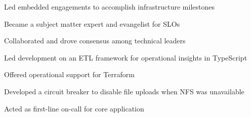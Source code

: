 \begin{job}
  
  \begin{accomplishments}
    \item Led embedded engagements to accomplish infrastructure milestones
    \item Became a subject matter expert and evangelist for SLOs
    \item Collaborated and drove consensus among technical leaders
    \item Led development on an ETL framework for operational insights in TypeScript
  \end{accomplishments}

  \begin{extendedaccomplishments}
    \item Offered operational support for Terraform
    \item Developed a circuit breaker to disable file uploads when NFS was unavailable
    \item Acted as first-line on-call for core application
  \end{extendedaccomplishments}
\end{job}
